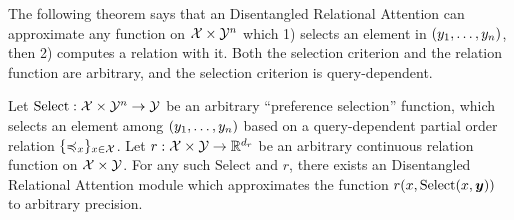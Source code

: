 The following theorem says that an Disentangled Relational Attention can approximate any function on ${\mathcal{X}} \times {\mathcal{Y}}^n$ which 1) selects an element in $(y_1, \ldots, y_n)$, then 2) computes a relation with it. Both the selection criterion and the relation function are arbitrary, and the selection criterion is query-dependent.
\begin{theorem}[Informal]
  Let $\mathrm{Select}: {\mathcal{X}} \times {\mathcal{Y}}^n \to {\mathcal{Y}}$ be an arbitrary ``preference selection'' function, which selects an element among $(y_1, \ldots, y_n)$ based on a query-dependent partial order relation $\{\preccurlyeq_x\}_{x \in {\mathcal{X}}}$. Let $r: {\mathcal{X}} \times {\mathcal{Y}} \to \mathbb{R}^{d_r}$ be an arbitrary continuous relation function on ${\mathcal{X}} \times {\mathcal{Y}}$. For any such $\mathrm{Select}$ and $r$, there exists an Disentangled Relational Attention module which approximates the function $r(x, \mathrm{Select}(x, \bm{y}))$ to arbitrary precision.
\end{theorem}